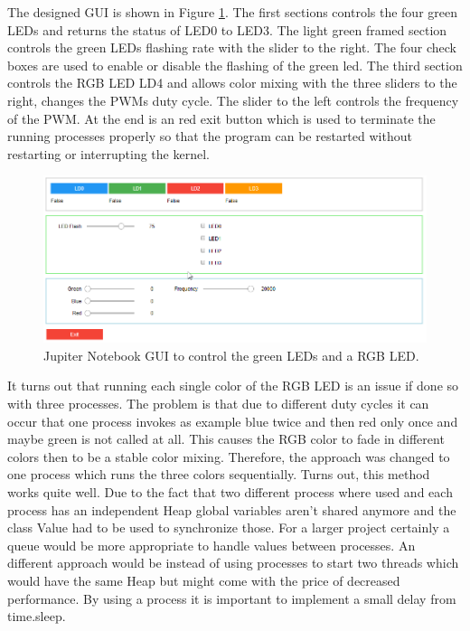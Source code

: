The designed GUI is shown in Figure \ref{fig: part1_gui}. The first sections controls the four green LEDs and returns the status of LED0 to LED3. The light green framed section controls the green LEDs flashing rate with the slider to the right. The four check boxes are used to enable or disable the flashing of the green led. The third section controls the RGB LED LD4 and allows color mixing with the three sliders to the right, changes the PWMs duty cycle. The slider to the left controls the frequency of the PWM. At the end is an red exit button which is used to terminate the running processes properly so that the program can be restarted without restarting or interrupting the kernel.
\begin{figure}[H]
	\centering
	\includegraphics[width=\textwidth]{01_images/p1_gui}
	\caption{Jupiter Notebook GUI to control the green LEDs and a RGB LED.}
	\label{fig: part1_gui}
\end{figure}

It turns out that running each single color of the RGB LED is an issue if done so with three processes. The problem is that due to different duty cycles it can occur that one process invokes as example blue twice and then red only once and maybe green is not called at all. This causes the RGB color to fade in different colors then to be a stable color mixing. Therefore, the approach was changed to one process which runs the three colors sequentially. Turns out, this method works quite well.
Due to the fact that two different process where used and each process has an independent Heap global variables aren't shared anymore and the class Value had to be used to synchronize those. For a larger project certainly a queue would be more appropriate to handle values between processes. An different approach would be instead of using processes to start two threads which would have the same Heap but might come with the price of decreased performance. By using a process it is important to implement a small delay from time.sleep. 

